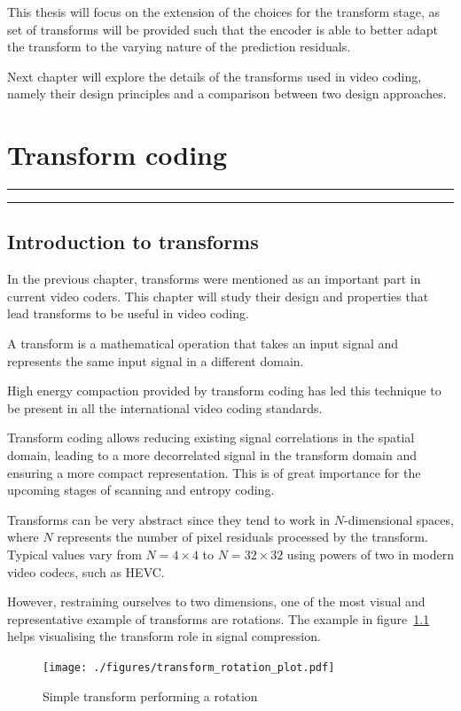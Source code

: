 \documentclass[11pt,a4paper,openright,twoside]{book}
\providecommand{\chaptertoc}{
	\startcontents[chapters]
	\hrule
	\vspace{1em}
	\printcontents[chapters]{}{1}{{\bf\large Contents}}
	\hrule
}
\numberwithin{equation}{section} %
\numberwithin{figure}{section} %
\numberwithin{table}{section} %
\begin{document}
This thesis will focus on the extension of the choices for the transform
stage, as set of transforms will be provided such that the encoder is able to
better adapt the transform to the varying nature of the prediction residuals.

Next chapter will explore the details of the transforms used in video coding,
namely their design principles and a comparison between two design approaches.

\chapter{Transform coding}
\label{cha:transform_coding}
\chaptertoc

\section{Introduction to transforms}
\label{sec:introduction_to_transforms}

In the previous chapter, transforms were mentioned as an important part
in current video coders.
This chapter will study their design and properties that lead transforms
to be useful in video coding.

A transform is a mathematical operation that takes an input signal and
represents the same input signal in a different domain.

High energy compaction provided by transform coding has led this
technique to be present in all the international video coding standards.

Transform coding allows reducing existing signal correlations in the
spatial domain, leading to a more decorrelated signal in the transform
domain and ensuring a more compact representation.
This is of great importance for the upcoming stages of scanning and
entropy coding.

Transforms can be very abstract since they tend to work in $N$-dimensional
spaces, where $N$ represents the number of pixel residuals processed by the
transform.
Typical values vary from $N=4\times4$ to $N=32\times32$ using powers of two in
modern video codecs, such as \ac{HEVC}.

However, restraining ourselves to two dimensions, one of the most visual
and representative example of transforms are rotations.
The example in figure~\ref{fig:transform_rotation} helps visualising the
transform role in signal compression.

\begin{figure}[tb]
	\centering
	\texttt{[image: ./figures/transform\_rotation\_plot.pdf]}
	\caption{Simple transform performing a rotation}
	\label{fig:transform_rotation}
\end{figure}
\end{document}
